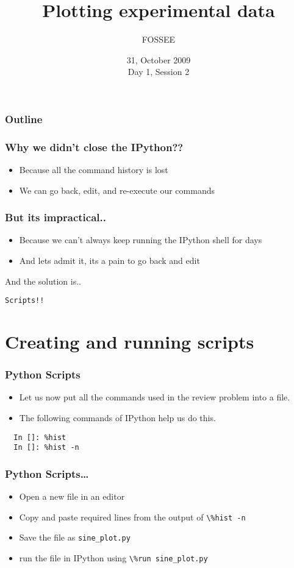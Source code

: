 \documentclass[14pt,compress]{beamer}
\title[Plotting using Python]{Plotting experimental data\\}
\author[FOSSEE] {FOSSEE}
\institute[IIT Bombay] {Department of Aerospace Engineering\\IIT Bombay}
\date[] {31, October 2009\\Day 1, Session 2}
\newcommand{\typ}[1]{\lstinline{#1}}
\begin{document}
\begin{frame}
  \titlepage
\end{frame}

\begin{frame}
  \frametitle{Outline}
  \tableofcontents
\end{frame}

\begin{frame}
\frametitle{Why we didn't close the IPython??}
\begin{itemize}
  \item Because all the command history is lost
  \item We can go back, edit, and re-execute our commands
\end{itemize}
\end{frame}

\begin{frame}
\frametitle{But its impractical..}
\begin{itemize}
  \item Because we can't always keep running the IPython shell for days
  \item And lets admit it, its a pain to go back and edit
\end{itemize}
And the solution is..\\
\begin{center}
\alert {\typ{Scripts!!}}
\end{center}
\end{frame}

\section{Creating and running scripts}
\begin{frame}[fragile]
\frametitle{Python Scripts}
\begin{itemize}
\item Let us now put all the commands used in the review problem into a file. 
\item The following commands of IPython help us do this. 
\end{itemize}
\begin{lstlisting}
  In []: %hist
  In []: %hist -n
\end{lstlisting}
\end{frame}

\begin{frame}
\frametitle{Python Scripts\ldots}
  \begin{itemize}
    \item Open a new file in an \alert{editor}
    \item Copy and paste required lines from the output of \typ{\%hist -n}
    \item Save the file as \typ{sine_plot.py}
  \end{itemize}
  \begin{itemize}
  \item run the file in IPython using \typ{\%run sine_plot.py}\\
  \end{itemize}
\end{frame}
\end{document}
